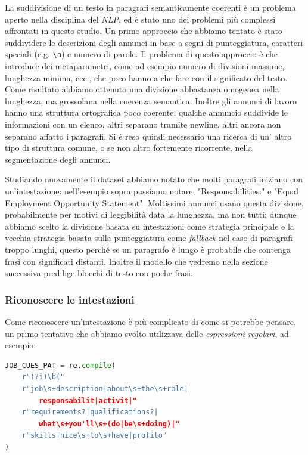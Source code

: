 \noindent La suddivisione di un testo in paragrafi semanticamente coerenti è un problema aperto nella disciplina del \textit{NLP}, ed è stato uno dei problemi più complessi affrontati in questo studio. Un primo approccio che abbiamo tentato è stato suddividere le descrizioni degli annunci in base a segni di punteggiatura, caratteri speciali (e.g. \texttt{\textbackslash n}) e numero di parole. Il problema di questo approccio è che introduce dei metaparametri, come ad esempio numero di divisioni massime, lunghezza minima, ecc., che poco hanno a che fare con il significato del testo. Come risultato abbiamo ottenuto una divisione abbastanza omogenea nella lunghezza, ma grossolana nella coerenza semantica. Inoltre gli annunci di lavoro hanno una struttura ortografica poco coerente: qualche annuncio suddivide le informazioni con un elenco, altri separano tramite newline, altri ancora non separano affatto i paragrafi. Si è reso quindi necessario una ricerca di un' altro tipo di struttura comune, o se non altro fortemente ricorrente, nella segmentazione degli annunci.

\medskip

\noindent Studiando nuovamente il dataset abbiamo notato che molti paragrafi iniziano con un'intestazione: nell'esempio sopra possiamo notare: "Responsabilities:" e "Equal Employment Opportunity Statement". Moltissimi annunci usano questa divisione, probabilmente  per motivi di leggibilità data la lunghezza, ma non tutti; dunque abbiamo scelto la divisione basata su intestazioni come strategia principale e la vecchia strategia basata sulla punteggiatura come \textit{fallback} nel caso di paragrafi troppo lunghi, questo perché se un paragrafo è lungo è probabile che contenga frasi con significati distanti. Inoltre il modello che vedremo nella sezione successiva predilige blocchi di testo con poche frasi.

\medskip
\subsubsection{Riconoscere le intestazioni}
\noindent Come riconoscere un'intestazione è più complicato di come si potrebbe pensare, un primo tentativo che abbiamo svolto utilizzava delle \textit{espressioni regolari}, ad esempio:

\begin{lstlisting}[language=python]
JOB_CUES_PAT = re.compile(
    r"(?i)\b("
    r"job\s+description|about\s+the\s+role|
        responsabilit|activit|"
    r"requirements?|qualifications?|
        what\s+you'll\s+(do|be\s+doing)|"
    r"skills|nice\s+to\s+have|profilo"
)
\end{lstlisting}

